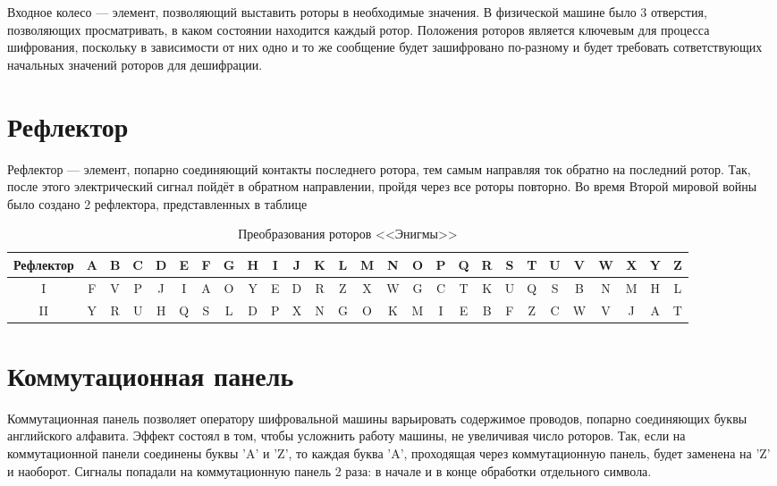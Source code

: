 Входное колесо --- элемент, позволяющий выставить роторы в необходимые значения. 
В физической машине было 3 отверстия, позволяющих просматривать, в каком состоянии находится каждый ротор.
Положения роторов является ключевым для процесса шифрования, поскольку в зависимости от них одно и то же сообщение будет зашифровано по-разному и будет требовать сответствующих начальных значений роторов для дешифрации.

\section{Рефлектор}

Рефлектор --- элемент, попарно соединяющий контакты последнего ротора, тем самым направляя ток обратно на последний ротор. Так, после этого электрический сигнал пойдёт в обратном направлении, пройдя через все роторы повторно. 
Во время Второй мировой войны было создано 2 рефлектора, представленных в таблице

\begin{table}[h]
\small
\setlength{\tabcolsep}{3pt}
	\begin{center}
		\begin{threeparttable}
		\captionsetup{justification=raggedright,singlelinecheck=off}
		\caption{\label{tbl:reflectors} Преобразования роторов <<Энигмы>>}
		\begin{tabular}{|c|c|c|c|c|c|c|c|c|c|c|c|c|c|c|c|c|c|c|c|c|c|c|c|c|c|c|}
			\hline
			Рефлектор & A & B & C & D & E & F & G & H & I & J & K & L & M & N & O & P & Q & R & S & T & U & V & W & X & Y & Z \\
			\hline
			I & F & V & P & J & I & A & O & Y & E & D & R & Z & X & W & G & C & T & K & U & Q & S & B & N & M & H & L \\
			\hline
			II & Y & R & U & H & Q & S & L & D & P & X & N & G & O & K & M & I & E & B & F & Z & C & W & V & J & A & T \\
			\hline
		\end{tabular}
		\end{threeparttable}
	\end{center}
	
\end{table}

\section{Коммутационная панель}

Коммутационная панель позволяет оператору шифровальной машины варьировать содержимое проводов, попарно соединяющих буквы английского алфавита. 
Эффект состоял в том, чтобы усложнить работу машины, не увеличивая число роторов.
Так, если на коммутационной панели соединены буквы 'A' и 'Z', то каждая буква 'A', проходящая через коммутационную панель, будет заменена на 'Z'  и наоборот. Сигналы попадали на коммутационную панель 2 раза: в начале и в конце обработки отдельного символа.